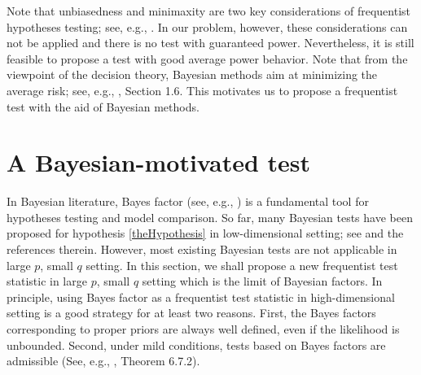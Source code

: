 \documentclass[smallextended]{svjour3}       %
\begin{document}
Note that unbiasedness and minimaxity are two key considerations of frequentist hypotheses testing; see, e.g., \cite{Lehmann}.
In our problem, however, these considerations can not be applied and there is no test with guaranteed power.
Nevertheless, it is still feasible to propose a test with good average power behavior.
Note that from the viewpoint of the decision theory, Bayesian methods aim at minimizing the average risk; see, e.g., \cite{Lehmann}, Section 1.6.
This motivates us to propose a frequentist test with the aid of Bayesian methods.



\section{A Bayesian-motivated test}\label{sec:methodology}

In Bayesian literature, Bayes factor (see, e.g., \cite{Robert1995Bayes}) is a fundamental tool for hypotheses testing and model comparison.
So far, many Bayesian tests have been proposed for hypothesis \eqref{theHypothesis} in low-dimensional setting; see \cite{javier2006Obj,Goddard2016,zhou2018On} and the references therein.
However, most existing Bayesian tests are not applicable in large $p$, small $q$ setting.
In this section, we shall propose a new frequentist test statistic in large $p$, small $q$ setting which is the limit of Bayesian factors.
In principle, using Bayes factor as a frequentist test statistic in high-dimensional setting is a good strategy for at least two reasons.
First, the Bayes factors corresponding to proper priors are always well defined, even if the likelihood is unbounded.
Second, under mild conditions, tests based on Bayes factors are admissible (See, e.g., \cite{Lehmann}, Theorem 6.7.2).
\end{document}
